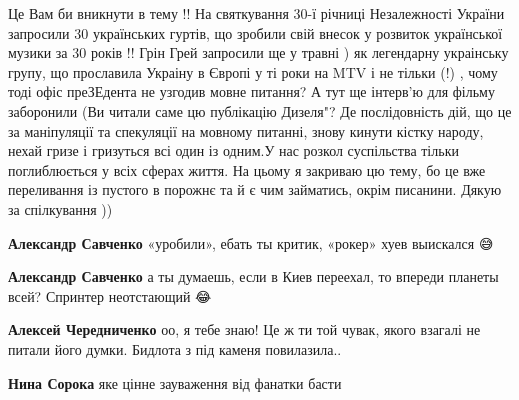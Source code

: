 \begin{itemize}
\begin{itemize}
Це Вам би вникнути в тему !! На святкування 30-ї річниці Незалежності України
запросили 30 українських гуртів, що зробили свій внесок у розвиток української
музики за 30 років !! Грін Грей запросили ще у травні ) як легендарну
украінську групу, що прославила Украіну в Європі у ті роки на MTV і не тільки
(!) , чому тоді офіс преЗЕдента не узгодив мовне питання? А тут ще інтерв'ю для
фільму заборонили (Ви читали саме цю публікацію Дизеля"? Де послідовність дій,
що це за маніпуляції та спекуляції на мовному питанні, знову кинути кістку
народу, нехай гризе і гризуться всі один із одним.У нас розкол суспільства
тільки поглиблюється у всіх сферах життя. На цьому я закриваю цю тему, бо це
вже переливання із пустого в порожнє та й є чим займатись, окрім писанини.
Дякую за спілкування ))


 
\textbf{Александр Савченко} «уробили», ебать ты критик, «рокер» хуев выискался 😅

 
\textbf{Александр Савченко} а ты думаешь, если в Киев переехал, то впереди планеты всей? Спринтер неотстающий 😂🤣🤣

 
\textbf{Алексей Чередниченко} оо, я тебе знаю!
Це ж ти той чувак, якого взагалі не питали його думки.
Бидлота з під каменя повилазила..

 
\textbf{Нина Сорока} яке цінне зауваження від фанатки басти


\end{itemize}
\end{itemize}
